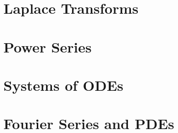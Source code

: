 \documentclass[letterpaper,oneside]{book}%
\theoremstyle{plain}
\theoremstyle{box}
\theoremstyle{problem}
\begin{document}
\chapter{Laplace Transforms}



\chapter{Power Series}




\chapter{Systems of ODEs}



\chapter{Fourier Series and PDEs}


\end{document}
